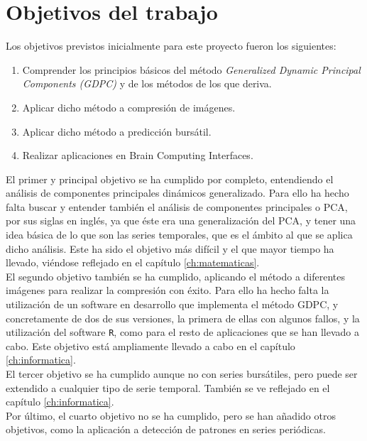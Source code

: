 \chapter{Objetivos del trabajo}

Los objetivos previstos inicialmente para este proyecto fueron los siguientes:
\begin{enumerate}
\item Comprender los principios básicos del método \textit{Generalized Dynamic Principal Components (GDPC)} y de los métodos de los que deriva.
\item Aplicar dicho método a compresión de imágenes.
\item Aplicar dicho método a predicción bursátil.
\item Realizar aplicaciones en Brain Computing Interfaces.
\end{enumerate}

El primer y principal objetivo se ha cumplido por completo, entendiendo el análisis de componentes principales dinámicos generalizado. Para ello ha hecho falta buscar y entender también el análisis de componentes principales o PCA, por sus siglas en inglés, ya que éste era una generalización del PCA, y tener una idea básica de lo que son las series temporales, que es el ámbito al que se aplica dicho análisis. Este ha sido el objetivo más difícil y el que mayor tiempo ha llevado, viéndose reflejado en el capítulo \ref{ch:matematicas}.\\

El segundo objetivo también se ha cumplido, aplicando el método a diferentes imágenes para realizar la compresión con éxito. Para ello ha hecho falta la utilización de un software en desarrollo que implementa el método GDPC, y concretamente de dos de sus versiones, la primera de ellas con algunos fallos, y la utilización del software \texttt{R}, como para el resto de aplicaciones que se han llevado a cabo. Este objetivo está ampliamente llevado a cabo en el capítulo \ref{ch:informatica}.\\

El tercer objetivo se ha cumplido aunque no con series bursátiles, pero puede ser extendido a cualquier tipo de serie temporal. También se ve reflejado en el capítulo \ref{ch:informatica}.\\

Por último, el cuarto objetivo no se ha cumplido, pero se han añadido otros objetivos, como la aplicación a detección de patrones en series periódicas.\\


